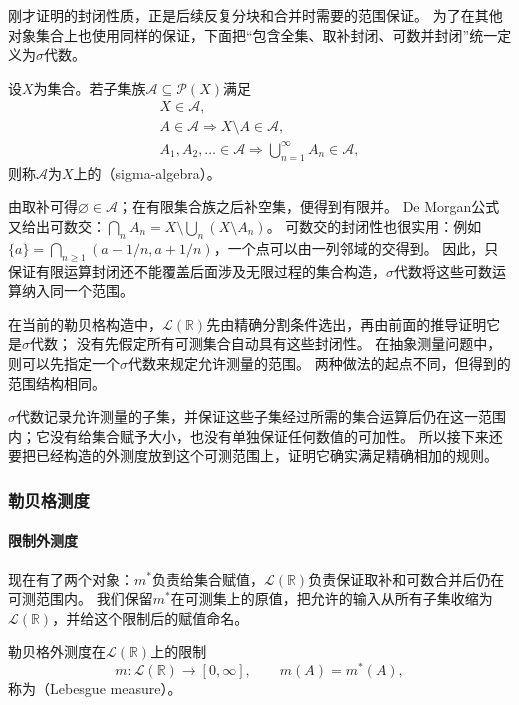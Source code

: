 刚才证明的封闭性质，正是后续反复分块和合并时需要的范围保证。
为了在其他对象集合上也使用同样的保证，下面把“包含全集、取补封闭、可数并封闭”统一定义为$\sigma$代数。
\begin{definition}[$\sigma$代数]
\label{def:analysis-sigma-algebra}
设$X$为集合。若子集族$\mathcal A\subseteq\mathcal P(X)$满足
\[
 \begin{gathered}
 X\in\mathcal A,\\
 A\in\mathcal A\Longrightarrow X\setminus A\in\mathcal A,\\
 A_1,A_2,\ldots\in\mathcal A
 \Longrightarrow\bigcup_{n=1}^{\infty}A_n\in\mathcal A,
 \end{gathered}
\]
则称$\mathcal A$为$X$上的（sigma-algebra）。
\end{definition}

由取补可得$\varnothing\in\mathcal A$；在有限集合族之后补空集，便得到有限并。
De Morgan公式又给出可数交：$\bigcap_nA_n=X\setminus\bigcup_n(X\setminus A_n)$。
可数交的封闭性也很实用：例如$\{a\}=\bigcap_{n\geq1}(a-1/n,a+1/n)$，一个点可以由一列邻域的交得到。
因此，只保证有限运算封闭还不能覆盖后面涉及无限过程的集合构造，$\sigma$代数将这些可数运算纳入同一个范围。

在当前的勒贝格构造中，$\mathcal L(\mathbb R)$先由精确分割条件选出，再由前面的推导证明它是$\sigma$代数；
没有先假定所有可测集合自动具有这些封闭性。
在抽象测量问题中，则可以先指定一个$\sigma$代数来规定允许测量的范围。
两种做法的起点不同，但得到的范围结构相同。

$\sigma$代数记录允许测量的子集，并保证这些子集经过所需的集合运算后仍在这一范围内；它没有给集合赋予大小，也没有单独保证任何数值的可加性。
所以接下来还要把已经构造的外测度放到这个可测范围上，证明它确实满足精确相加的规则。

\subsubsection{勒贝格测度}

\paragraph{限制外测度}

现在有了两个对象：$m^*$负责给集合赋值，$\mathcal L(\mathbb R)$负责保证取补和可数合并后仍在可测范围内。
我们保留$m^*$在可测集上的原值，把允许的输入从所有子集收缩为$\mathcal L(\mathbb R)$，并给这个限制后的赋值命名。
\begin{definition}[勒贝格测度]
\label{def:analysis-lebesgue-measure}
勒贝格外测度在$\mathcal L(\mathbb R)$上的限制
\[
 m:\mathcal L(\mathbb R)\to[0,\infty],\qquad m(A)=m^*(A),
\]
称为（Lebesgue measure）。
\end{definition}

